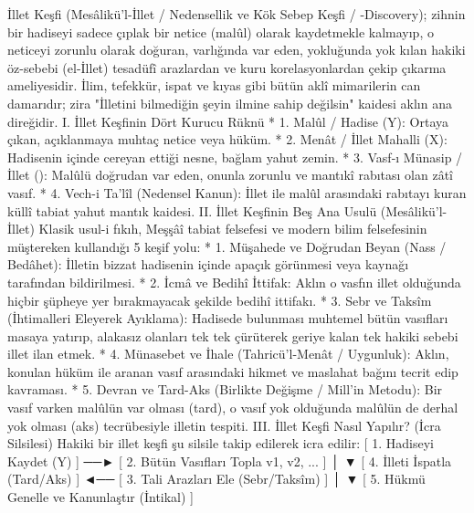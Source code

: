 \documentclass[11pt,a4paper]{article}
\begin{document}
İllet Keşfi (Mesâlikü'l-İllet / Nedensellik ve Kök Sebep Keşfi / -Discovery); zihnin bir hadiseyi sadece çıplak bir netice (malûl) olarak kaydetmekle kalmayıp, o neticeyi zorunlu olarak doğuran, varlığında var eden, yokluğunda yok kılan hakiki öz-sebebi (el-İllet) tesadüfî arazlardan ve kuru korelasyonlardan çekip çıkarma ameliyesidir.
İlim, tefekkür, ispat ve kıyas gibi bütün aklî mimarilerin can damarıdır; zira "İlletini bilmediğin şeyin ilmine sahip değilsin" kaidesi aklın ana direğidir.
I. İllet Keşfinin Dört Kurucu Rüknü
 * 1. Malûl / Hadise (Y): Ortaya çıkan, açıklanmaya muhtaç netice veya hüküm.
 * 2. Menât / İllet Mahalli (X): Hadisenin içinde cereyan ettiği nesne, bağlam yahut zemin.
 * 3. Vasf-ı Münasip / İllet (): Malûlü doğrudan var eden, onunla zorunlu ve mantıkî rabıtası olan zâtî vasıf.
 * 4. Vech-i Ta'lîl (Nedensel Kanun): İllet ile malûl arasındaki rabıtayı kuran küllî tabiat yahut mantık kaidesi.
II. İllet Keşfinin Beş Ana Usulü (Mesâlikü'l-İllet)
Klasik usul-i fıkıh, Meşşâî tabiat felsefesi ve modern bilim felsefesinin müştereken kullandığı 5 keşif yolu:
 * 1. Müşahede ve Doğrudan Beyan (Nass / Bedâhet): İlletin bizzat hadisenin içinde apaçık görünmesi veya kaynağı tarafından bildirilmesi.
 * 2. İcmâ ve Bedihî İttifak: Aklın o vasfın illet olduğunda hiçbir şüpheye yer bırakmayacak şekilde bedihî ittifakı.
 * 3. Sebr ve Taksîm (İhtimalleri Eleyerek Ayıklama): Hadisede bulunması muhtemel bütün vasıfları masaya yatırıp, alakasız olanları tek tek çürüterek geriye kalan tek hakiki sebebi illet ilan etmek.
 * 4. Münasebet ve İhale (Tahricü'l-Menât / Uygunluk): Aklın, konulan hüküm ile aranan vasıf arasındaki hikmet ve maslahat bağını tecrit edip kavraması.
 * 5. Devran ve Tard-Aks (Birlikte Değişme / Mill'in Metodu): Bir vasıf varken malûlün var olması (tard), o vasıf yok olduğunda malûlün de derhal yok olması (aks) tecrübesiyle illetin tespiti.
III. İllet Keşfi Nasıl Yapılır? (İcra Silsilesi)
Hakiki bir illet keşfi şu silsile takip edilerek icra edilir:
[ 1. Hadiseyi Kaydet (Y) ] ──► [ 2. Bütün Vasıfları Topla {v1, v2, ...} ]
                                              │
                                              ▼
[ 4. İlleti İspatla (Tard/Aks) ] ◄── [ 3. Tali Arazları Ele (Sebr/Taksîm) ]
         │
         ▼
[ 5. Hükmü Genelle ve Kanunlaştır (İntikal) ]
\end{document}
